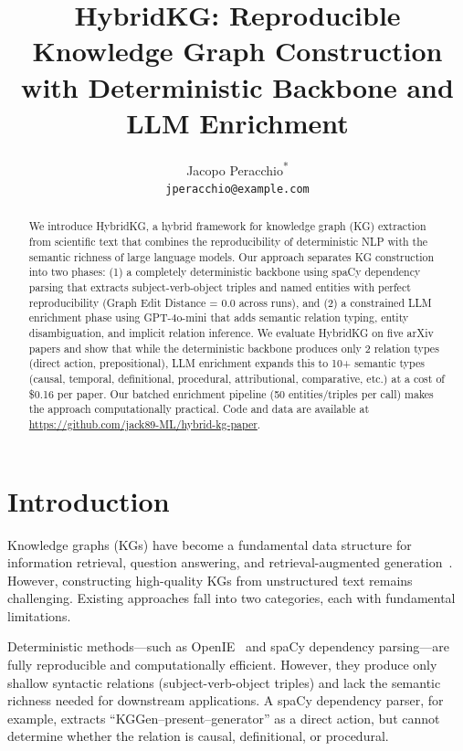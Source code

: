 \documentclass{article}
\title{HybridKG: Reproducible Knowledge Graph Construction with Deterministic Backbone and LLM Enrichment}
\author{
    Jacopo Peracchio\textsuperscript{*} \\
    \texttt{jperacchio@example.com}
}
\newcommand{\method}{HybridKG\xspace}
\begin{document}
\maketitle

\begin{abstract}
We introduce \method, a hybrid framework for knowledge graph (KG) extraction from scientific text that combines the reproducibility of deterministic NLP with the semantic richness of large language models. Our approach separates KG construction into two phases: (1) a completely deterministic backbone using spaCy dependency parsing that extracts subject-verb-object triples and named entities with perfect reproducibility (Graph Edit Distance = 0.0 across runs), and (2) a constrained LLM enrichment phase using GPT-4o-mini that adds semantic relation typing, entity disambiguation, and implicit relation inference. We evaluate \method on five arXiv papers and show that while the deterministic backbone produces only 2 relation types (direct action, prepositional), LLM enrichment expands this to 10+ semantic types (causal, temporal, definitional, procedural, attributional, comparative, etc.) at a cost of \$0.16 per paper. Our batched enrichment pipeline (50 entities/triples per call) makes the approach computationally practical. Code and data are available at \url{https://github.com/jack89-ML/hybrid-kg-paper}.
\end{abstract}

\section{Introduction}

Knowledge graphs (KGs) have become a fundamental data structure for information retrieval, question answering, and retrieval-augmented generation~\cite{schneider1973, shenoy2021}. However, constructing high-quality KGs from unstructured text remains challenging. Existing approaches fall into two categories, each with fundamental limitations.

Deterministic methods---such as OpenIE~\cite{angeli2015stanford} and spaCy dependency parsing---are fully reproducible and computationally efficient. However, they produce only shallow syntactic relations (subject-verb-object triples) and lack the semantic richness needed for downstream applications. A spaCy dependency parser, for example, extracts ``KGGen--present--generator'' as a direct action, but cannot determine whether the relation is causal, definitional, or procedural.
\end{document}
